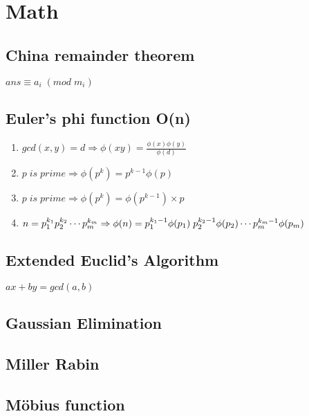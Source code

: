 \documentclass[11pt,twocolumn,a4paper]{article}
\begin{document}

\newpage
\section{Math}
\subsection{China remainder theorem}
$ ans \equiv  a_i\; (mod\; m_i) $


\subsection{Euler's phi function O(n)}
\begin{enumerate}[1.]
\item $gcd(x,y)=d \Rightarrow \phi(xy) = \frac{\phi(x) \phi(y)}{\phi(d)}$
\item $p\; is\; prime \Rightarrow \phi(p^k) = p^{k-1} \phi(p)$
\item $p\; is\; prime \Rightarrow \phi(p^k) = \phi(p^{k-1}) \times p$
\item $n = p_{1}^{k_1} p_{2}^{k_2} \cdots p_{m}^{k_m}\\
\Rightarrow \phi(n) = p_{1}^{k_1-1}\phi(p_1)\; p_{2}^{k_2-1}\phi(p_2) \cdots p_{m}^{k_m-1}\phi(p_m)$
\end{enumerate}


\subsection{Extended Euclid's Algorithm}
$ ax+by=gcd(a,b) $


\subsection{Gaussian Elimination}


\subsection{Miller Rabin}


\subsection{Möbius function}

\end{document}
